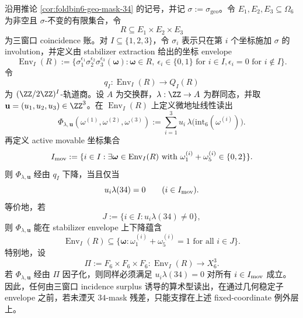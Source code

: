 \begin{proposition}\label{distill:hrushovski_zilber_zariski_geometries_and_elekes_szabo_group_extraction-incidence_surplus_forces_algebraic_explanation-window6-stabilizer-envelope-arithmetic-veto}
沿用推论 \ref{cor:foldbin6-geo-mask-34} 的记号，并记
\(\sigma:=\sigma_{\mathrm{geo}}\)。令
\(E_1,E_2,E_3\subseteq\Omega_6\) 为非空且 \(\sigma\)-不变的有限集合，令
\[
R\subseteq E_1\times E_2\times E_3
\]
为三窗口 coincidence 账。对 \(I\subseteq\{1,2,3\}\)，令 \(\sigma_i\) 表示只在第 \(i\) 个坐标施加 \(\sigma\) 的 involution，并定义由 stabilizer extraction 给出的坐标 envelope
\[
\operatorname{Env}_I(R):=
\{\sigma_1^{\epsilon_1}\sigma_2^{\epsilon_2}\sigma_3^{\epsilon_3}(\boldsymbol\omega):
\boldsymbol\omega\in R,\ \epsilon_i\in\{0,1\}\text{ for }i\in I,
\epsilon_i=0\text{ for }i\notin I\}.
\]
令
\[
q_I:\operatorname{Env}_I(R)\longrightarrow Q_I(R)
\]
为 \((\ZZ/2\ZZ)^I\)-轨道商。设 \(A\) 为交换群，\(\lambda:\ZZ\to A\) 为群同态，并取
\(\mathbf u=(u_1,u_2,u_3)\in\ZZ^3\)。在
\(\operatorname{Env}_I(R)\) 上定义微地址线性读出
\[
\Phi_{\lambda,\mathbf u}(\omega^{(1)},\omega^{(2)},\omega^{(3)})
:=\sum_{i=1}^3 u_i\,\lambda\bigl(\mathrm{int}_6(\omega^{(i)})\bigr).
\]
再定义 active movable 坐标集合
\[
I_{\rm mov}:=\{i\in I:\exists\boldsymbol\omega\in\operatorname{Env}_I(R)
\text{ with }\omega^{(i)}_1+\omega^{(i)}_5\in\{0,2\}\}.
\]
则 \(\Phi_{\lambda,\mathbf u}\) 经由 \(q_I\) 下降，当且仅当
\[
 u_i\lambda(34)=0\qquad(i\in I_{\rm mov}).
\]
等价地，若
\[
J:=\{i\in I:u_i\lambda(34)\ne0\},
\]
则 \(\Phi_{\lambda,\mathbf u}\) 能在 stabilizer envelope 上下降蕴含
\[
\operatorname{Env}_I(R)\subseteq
\{\boldsymbol\omega:\omega^{(i)}_1+\omega^{(i)}_5=1\text{ for all }i\in J\}.
\]
特别地，设
\[
\Pi:=F_6\times F_6\times F_6:\operatorname{Env}_I(R)\longrightarrow X_6^3.
\]
若 \(\Phi_{\lambda,\mathbf u}\) 经由 \(\Pi\) 因子化，则同样必须满足
\(u_i\lambda(34)=0\) 对所有 \(i\in I_{\rm mov}\) 成立。因此，任何由三窗口 incidence surplus 诱导的算术型读出，在通过几何稳定子 envelope 之前，若未湮灭 \(34\)-mask 残差，只能支撑在上述 fixed-coordinate 例外层上。
\end{proposition}

